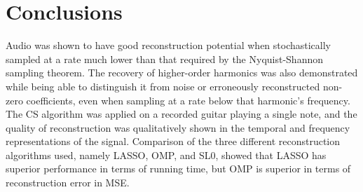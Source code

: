 \documentclass[10pt,a4paper,twoside]{article}
\begin{document}
\section{Conclusions}\label{sec:Conc}
Audio was shown to have good reconstruction potential when stochastically sampled at a rate much lower than that required by the Nyquist-Shannon sampling theorem. The recovery of higher-order harmonics was also demonstrated while being able to distinguish it from noise or erroneously reconstructed non-zero coefficients, even when sampling at a rate below that harmonic's frequency. The CS algorithm was applied on a recorded guitar playing a single note, and the quality of reconstruction was qualitatively shown in the temporal and frequency representations of the signal. Comparison of the three different reconstruction algorithms used, namely LASSO, OMP, and SL0, showed that LASSO has superior performance in terms of running time, but OMP is superior in terms of reconstruction error in MSE.

\end{document}
